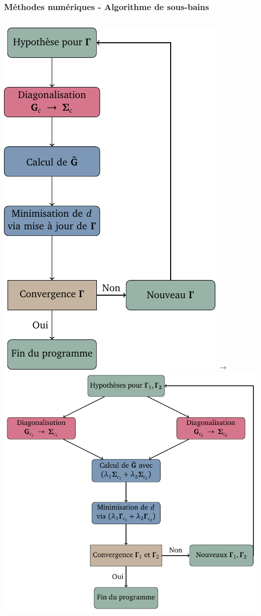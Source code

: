 \begin{frame}
    \frametitle{Méthodes numériques - Algorithme de sous-bains}
    \begin{columns}
        \includegraphics[scale=0.45]{./figures/theory/flow_chart.pdf}
        \Large
        $\longrightarrow$
        \includegraphics[scale=0.45]{./figures/theory/flow_chart_sub_baths.pdf}
    \end{columns}
\end{frame}
